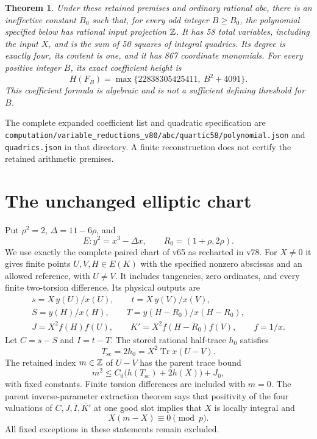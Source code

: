 \documentclass[11pt,a4paper]{article}
\newtheorem{theorem}{Theorem}[section]
\DeclareMathOperator{\Tr}{Tr}\DeclareMathOperator{\Nm}{Nm}
\begin{document}
\begin{theorem}\label{thm:main}
Under these retained premises and ordinary rational abc, there is an
ineffective constant $B_0$ such that, for every odd integer $B\ge B_0$,
the polynomial specified below has rational input projection $\mathbb Z$.
It has 58 total variables, including the input $X$, and is the sum of
50 squares of integral quadrics. Its degree is exactly four, its content
is one, and it has 867 coordinate monomials. For every positive integer
$B$, its exact coefficient height is
\[
 H(F_B)=\max\{22838305425411,\ B^2+4091\}.
\]
This coefficient formula is algebraic and is not a sufficient defining
threshold for $B$.
\end{theorem}

The complete expanded coefficient list and quadratic specification are
\nolinkurl{computation/variable_reductions_v80/abc/quartic58/polynomial.json}
and \nolinkurl{quadrics.json} in that directory. A finite reconstruction
does not certify the retained arithmetic premises.

\section{The unchanged elliptic chart}

Put $\rho^2=2$, $\Delta=11-6\rho$, and
\[
 E:y^2=x^3-\Delta x,\qquad R_0=(1+\rho,2\rho).
\]
We use exactly the complete paired chart of v65 as recharted in
v78. For $X\ne0$ it gives finite points $U,V,H\in E(K)$ with the
specified nonzero abscissas and an allowed reference, with $U\ne V$.
It includes tangencies, zero ordinates, and every finite two-torsion
difference. Its physical outputs are
\[
\begin{gathered}
 s=X\,y(U)/x(U),\qquad t=X\,y(V)/x(V),\\
 S=y(H)/x(H),\qquad T=y(H-R_0)/x(H-R_0),\\
 J=X^2f(H)f(U),\qquad K'=X^2f(H-R_0)f(V),\qquad f=1/x.
\end{gathered}
\]
Let $C=s-S$ and $I=t-T$. The stored rational half-trace $h_0$ satisfies
\[
 T_{\mathrm{sc}}=2h_0=X^2\Tr x(U-V).
\]
The retained index $m\in\mathbb Z$ of $U-V$ has the parent trace bound
\begin{equation}\label{eq:index}
 m^2\le C_0\bigl(h(T_{\mathrm{sc}})+2h(X)\bigr)+J_0,
\end{equation}
with fixed constants. Finite torsion differences are included with
$m=0$. The parent inverse-parameter extraction theorem says that
positivity of the four valuations of $C,J,\overline I,\overline{K'}$
at one good slot implies that $X$ is locally integral and
\begin{equation}\label{eq:local-label}
                         X(m-X)\equiv0\pmod p.
\end{equation}
All fixed exceptions in these statements remain excluded.
\end{document}

